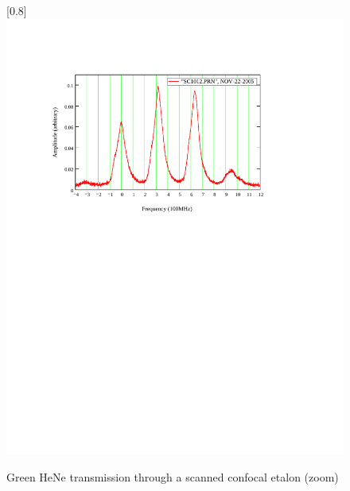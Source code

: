 \begin{figure}
\scalebox{0.8}[0.8]{
\includegraphics[bb=15 440 489 752]
{confocal_zoom/confocal_zoom.pdf}
}
\caption[Green HeNe transmission through a scaned confocal etalon (zoom)]{Green HeNe transmission through a scanned confocal etalon (zoom)}
\label{confocal_zoom}
\end{figure}
